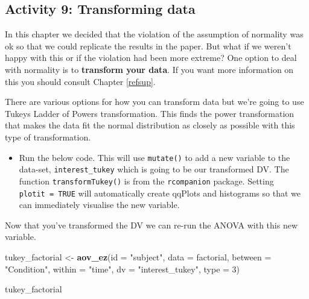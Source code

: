 \documentclass[]{book}
\newenvironment{Shaded}{\begin{snugshade}}{\end{snugshade}}
\newcommand{\DataTypeTok}[1]{\textcolor[rgb]{0.13,0.29,0.53}{#1}}
\newcommand{\DecValTok}[1]{\textcolor[rgb]{0.00,0.00,0.81}{#1}}
\newcommand{\KeywordTok}[1]{\textcolor[rgb]{0.13,0.29,0.53}{\textbf{#1}}}
\newcommand{\NormalTok}[1]{#1}
\newcommand{\OperatorTok}[1]{\textcolor[rgb]{0.81,0.36,0.00}{\textbf{#1}}}
\newcommand{\OtherTok}[1]{\textcolor[rgb]{0.56,0.35,0.01}{#1}}
\newcommand{\StringTok}[1]{\textcolor[rgb]{0.31,0.60,0.02}{#1}}
\providecommand{\tightlist}{%
  \setlength{\itemsep}{0pt}\setlength{\parskip}{0pt}}
\begin{document}
\hypertarget{activity-9-transforming-data}{%
\subsection{Activity 9: Transforming data}\label{activity-9-transforming-data}}

In this chapter we decided that the violation of the assumption of normality was ok so that we could replicate the results in the paper. But what if we weren't happy with this or if the violation had been more extreme? One option to deal with normality is to \textbf{transform your data}. If you want more information on this you should consult Chapter \ref{refsup}.

There are various options for how you can transform data but we're going to use Tukeys Ladder of Powers transformation. This finds the power transformation that makes the data fit the normal distribution as closely as possible with this type of transformation.

\begin{itemize}
\tightlist
\item
  Run the below code. This will use \texttt{mutate()} to add a new variable to the data-set, \texttt{interest\_tukey} which is going to be our transformed DV. The function \texttt{transformTukey()} is from the \texttt{rcompanion} package. Setting \texttt{plotit\ =\ TRUE} will automatically create qqPlots and histograms so that we can immediately visualise the new variable.
\end{itemize}

\begin{Shaded}
\end{Shaded}

Now that you've transformed the DV we can re-run the ANOVA with this new variable.

\begin{Shaded}
\begin{Highlighting}[]
\NormalTok{tukey_factorial <-}\StringTok{ }\KeywordTok{aov_ez}\NormalTok{(}\DataTypeTok{id =} \StringTok{"subject"}\NormalTok{,}
               \DataTypeTok{data =}\NormalTok{ factorial, }
               \DataTypeTok{between =} \StringTok{"Condition"}\NormalTok{, }
               \DataTypeTok{within =} \StringTok{"time"}\NormalTok{,}
               \DataTypeTok{dv =} \StringTok{"interest_tukey"}\NormalTok{, }
               \DataTypeTok{type =} \DecValTok{3}\NormalTok{)}

\NormalTok{tukey_factorial}
\end{Highlighting}
\end{Shaded}
\end{document}
